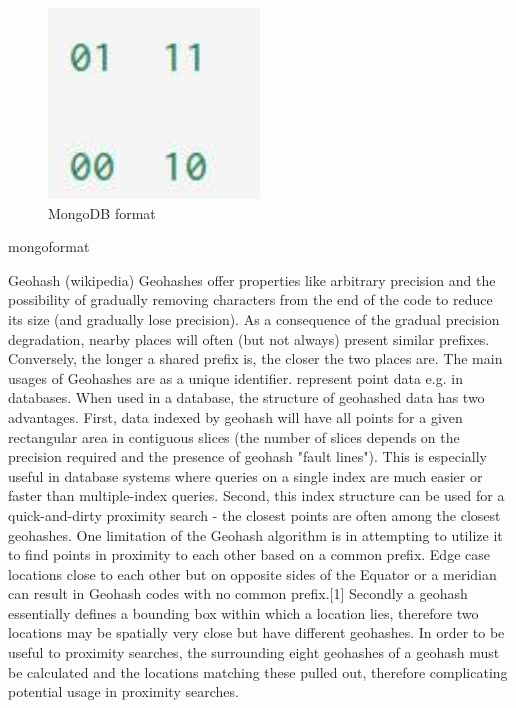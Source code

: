 \begin{figure}
\centering
\includegraphics[width=0.5\textwidth]{mongoformat}
\caption{MongoDB format}
\label{fig1}
\end{figure}

mongoformat

Geohash (wikipedia)
Geohashes offer properties like arbitrary precision and the possibility of gradually removing characters from the end of the code to reduce its size (and gradually lose precision).
As a consequence of the gradual precision degradation, nearby places will often (but not always) present similar prefixes. Conversely, the longer a shared prefix is, the closer the two places are.
The main usages of Geohashes are
as a unique identifier.
represent point data e.g. in databases.
When used in a database, the structure of geohashed data has two advantages. First, data indexed by geohash will have all points for a given rectangular area in contiguous slices (the number of slices depends on the precision required and the presence of geohash "fault lines"). This is especially useful in database systems where queries on a single index are much easier or faster than multiple-index queries. Second, this index structure can be used for a quick-and-dirty proximity search - the closest points are often among the closest geohashes.
One limitation of the Geohash algorithm is in attempting to utilize it to find points in proximity to each other based on a common prefix. Edge case locations close to each other but on opposite sides of the Equator or a meridian can result in Geohash codes with no common prefix.[1]
Secondly a geohash essentially defines a bounding box within which a location lies, therefore two locations may be spatially very close but have different geohashes. In order to be useful to proximity searches, the surrounding eight geohashes of a geohash must be calculated and the locations matching these pulled out, therefore complicating potential usage in proximity searches.

